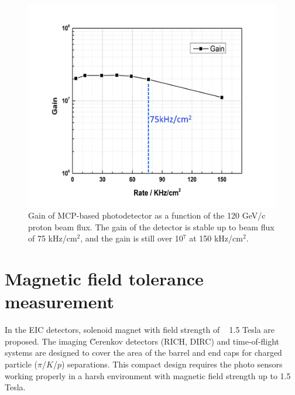 \documentclass[preprint,5p]{elsarticle}
\begin{document}
\begin{figure}[tbp]
\centering 
\includegraphics[scale=0.25]{fig/MCPs_gain_proton_beam.png}
\caption{Gain of MCP-based photodetector as a function of the 120 GeV/c proton 
beam flux. The gain of the detector is stable up to beam flux of 75 kHz/cm$^2$, 
and the gain is still over 10$^7$ at 150 kHz/cm$^2$. } 
\label{fig:MCPs_gain_proton_beam}
\end{figure}

\section{Magnetic field tolerance measurement}\label{sec_B_measurement}
In the EIC detectors, solenoid magnet with field strength of ~ 1.5 Tesla are 
proposed. The imaging \u Cerenkov detectors (RICH, DIRC) and time-of-flight 
systems are designed to cover the area of the barrel and end caps for charged 
particle ($\pi$/$K$/$p$) separations. This compact design requires the photo 
sensors working properly in a harsh environment with magnetic field strength up 
to 1.5 Tesla. 
\end{document}
